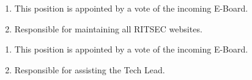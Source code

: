 


\begin{enumerate}
  \item This position is appointed by a vote of the incoming E-Board. 
  \item Responsible for maintaining all RITSEC websites.
\end{enumerate}


\begin{enumerate}
  \item This position is appointed by a vote of the incoming E-Board.
  \item Responsible for assisting the Tech Lead.
\end{enumerate}
